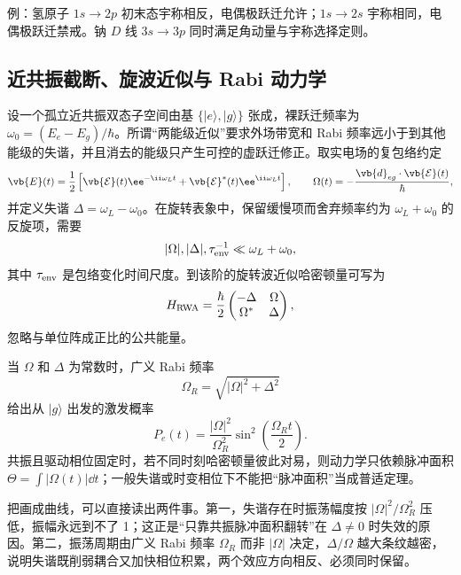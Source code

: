 例：氢原子 $1s\to2p$ 初末态宇称相反，电偶极跃迁允许；$1s\to2s$ 宇称相同，电偶极跃迁禁戒。钠 $D$ 线 $3s\to3p$ 同时满足角动量与宇称选择定则。

\subsection{近共振截断、旋波近似与 Rabi 动力学}

设一个孤立近共振双态子空间由基 $\{|e\rangle,|g\rangle\}$ 张成，裸跃迁频率为 $\omega_0=(E_e-E_g)/\hbar$。所谓“两能级近似”要求外场带宽和 Rabi 频率远小于到其他能级的失谐，并且消去的能级只产生可控的虚跃迁修正。取实电场的复包络约定
\begin{equation}
\vb{E}(t)
=\frac12\left[\vb{\mathcal E}(t)\ee^{-\ii\omega_L t}
+\vb{\mathcal E}^{*}(t)\ee^{\ii\omega_L t}\right],
\qquad
\Omega(t)=-\frac{\vb{d}_{eg}\cdot\vb{\mathcal E}(t)}{\hbar},
\label{eq:rabi-frequency-convention}
\end{equation}
并定义失谐 $\Delta=\omega_L-\omega_0$。在旋转表象中，保留缓慢项而舍弃频率约为 $\omega_L+\omega_0$ 的反旋项，需要
\begin{equation}
|\Omega|,|\Delta|,\tau_{\rm env}^{-1}\ll \omega_L+\omega_0,
\label{eq:rwa-condition}
\end{equation}
其中 $\tau_{\rm env}$ 是包络变化时间尺度。到该阶的旋转波近似哈密顿量可写为
\begin{equation}
H_{\rm RWA}
=\frac{\hbar}{2}
\begin{pmatrix}
-\Delta&\Omega\\
\Omega^*&\Delta
\end{pmatrix},
\label{eq:rwa-hamiltonian}
\end{equation}
忽略与单位阵成正比的公共能量。

当 $\Omega$ 和 $\Delta$ 为常数时，广义 Rabi 频率
\[
\Omega_R=\sqrt{|\Omega|^2+\Delta^2}
\]
给出从 $|g\rangle$ 出发的激发概率
\begin{equation}
P_e(t)
=\frac{|\Omega|^2}{\Omega_R^2}
\sin^2\!\left(\frac{\Omega_Rt}{2}\right).
\label{eq:rabi-probability}
\end{equation}
共振且驱动相位固定时，若不同时刻哈密顿量彼此对易，则动力学只依赖脉冲面积 $\Theta=\int|\Omega(t)|\dd t$；一般失谐或时变相位下不能把“脉冲面积”当成普适定理。

把画成曲线，可以直接读出两件事。第一，失谐存在时振荡幅度按 $|\Omega|^2/\Omega_R^2$ 压低，振幅永远到不了 1；这正是“只靠共振脉冲面积翻转”在 $\Delta\ne0$ 时失效的原因。第二，振荡周期由广义 Rabi 频率 $\Omega_R$ 而非 $|\Omega|$ 决定，$\Delta/\Omega$ 越大条纹越密，说明失谐既削弱耦合又加快相位积累，两个效应方向相反、必须同时保留。

